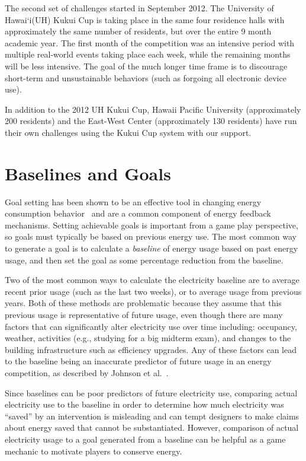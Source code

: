 \documentclass[10pt, conference, compsocconf]{IEEEtran}
\newcommand{\Hawaii}{Hawai`i\xspace}
\begin{document}
The second set of challenges started in September 2012. The University of \Hawaii (UH) Kukui Cup is taking place in the same four residence halls with approximately the same number of residents, but over the entire 9 month academic year. The first month of the competition was an intensive period with multiple real-world events taking place each week, while the remaining months will be less intensive. The goal of the much longer time frame is to discourage short-term and unsustainable behaviors (such as forgoing all electronic device use). 

In addition to the 2012 UH Kukui Cup, Hawaii Pacific University (approximately 200 residents) and the East-West Center (approximately 130 residents) have run their own challenges using the Kukui Cup system with our support.

\section{Baselines and Goals}
\label{sec:goals-baselines}

Goal setting has been shown to be an effective tool in changing energy consumption behavior~\cite{Becker78, Houwelingen89} and are a common component of energy feedback mechanisms. Setting achievable goals is important from a game play perspective, so goals must typically be based on previous energy use. The most common way to generate a goal is to calculate a \emph{baseline} of energy usage based on past energy usage, and then set the goal as some percentage reduction from the baseline.

Two of the most common ways to calculate the electricity baseline are to average recent prior usage (such as the last two weeks), or to average usage from previous years. Both of these methods are problematic because they assume that this previous usage is representative of future usage, even though there are many factors that can significantly alter electricity use over time including: occupancy, weather, activities (e.g., studying for a big midterm exam), and changes to the building infrastructure such as efficiency upgrades. Any of these factors can lead to the baseline being an inaccurate predictor of future usage in an energy competition, as described by Johnson et al.~\cite{csdl2-12-08}.

Since baselines can be poor predictors of future electricity use, comparing actual electricity use to the baseline in order to determine how much electricity was ``saved'' by an intervention is misleading and can tempt designers to make claims about energy saved that cannot be substantiated. However, comparison of actual electricity usage to a goal generated from a baseline can be helpful as a game mechanic to motivate players to conserve energy.
\end{document}
